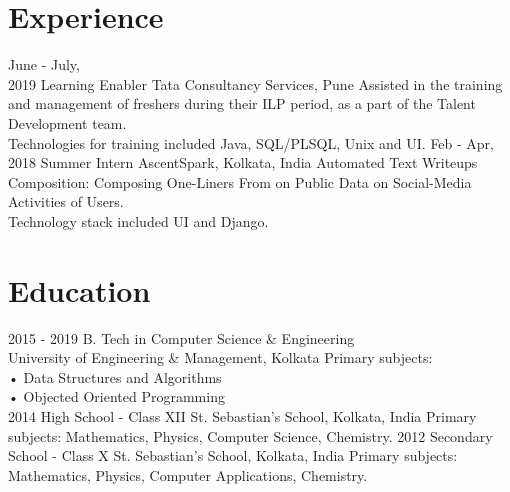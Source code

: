 \documentclass[]{friggeri-cv}
\begin{document}
\section{Experience}
\begin{entrylist}
    \entry
    {June - July, \\ 2019}
    {Learning Enabler}
    {Tata Consultancy Services, Pune}
    {Assisted in the training and management of freshers during their ILP period, as a part of the Talent Development team. \\Technologies for training included Java, SQL/PLSQL, Unix and UI.}
    \entry
    {Feb - Apr, \\ 2018}
    {Summer Intern}
    {AscentSpark, Kolkata, India}
    {Automated Text Writeups Composition: Composing One-Liners From on Public Data on Social-Media Activities of Users. \\Technology stack included UI and Django.}
\end{entrylist}

\section{Education}
\begin{entrylist}
  \entry
    {2015 - 2019}
    {B. Tech in Computer Science \& Engineering\\}
    {University of Engineering \& Management, Kolkata}
    {Primary subjects: \\
        • Data Structures and Algorithms\\
        • Objected Oriented Programming\\
    }
  \entry
    {2014}
    {High School - Class XII}
    {St. Sebastian's School, Kolkata, India}
    {Primary subjects: Mathematics, Physics, Computer Science, Chemistry.}
   \entry
    {2012}
    {Secondary School - Class X}
    {St. Sebastian's School, Kolkata, India}
    {Primary subjects: Mathematics, Physics, Computer Applications, Chemistry.}
\end{entrylist}
\end{document}
